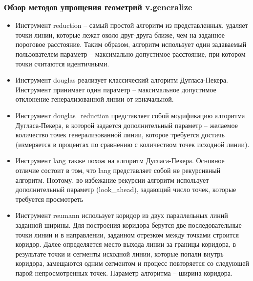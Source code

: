 \begin{frame}[allowframebreaks]
    \frametitle{Обзор методов упрощения геометрий v.generalize}
    \begin{itemize}
        \item Инструмент reduction -- самый простой алгоритм из представленных, удаляет точки линии, которые лежат около друг-друга ближе, чем на заданное пороговое расстояние. Таким образом, алгоритм использует один задаваемый пользователем параметр -- максимально допустимое расстояние, при котором точки считаются идентичными.
        \item Инструмент douglas реализует классический алгоритм Дугласа-Пекера. Инструмент принимает один параметр -- максимальное допустимое отклонение генерализованной линии от изначальной.
        \item Инструмент douglas\_reduction представляет собой модификацию алгоритма Дугласа-Пекера, в которой задается дополнительный параметр -- желаемое количество точек генерализованной линии, которое требуется достичь (измеряется в процентах по сравнению с количеством точек исходной линии).
        \item Инструмент lang также похож на алгоритм Дугласа-Пекера. Основное отличие состоит в том, что lang представляет собой не рекурсивный алгоритм. Поэтому, во избежание рекурсии алгоритм использует дополнительный параметр (look\_ahead), задающий число точек, которые требуется просмотреть
        \item Инструмент reumann использует коридор из двух параллельных линий заданной ширины. Для построения коридора берутся две последовательные точки линии и в направлении, заданном отрезком между точками строится коридор. Далее определяется место выхода линии за границы коридора, в результате точки и сегменты исходной линии, которые попали внутрь коридора, замещаются одним сегментом и процесс повторяется со следующей парой непросмотренных точек. Параметр алгоритма -- ширина коридора.
    \end{itemize}
\end{frame}

